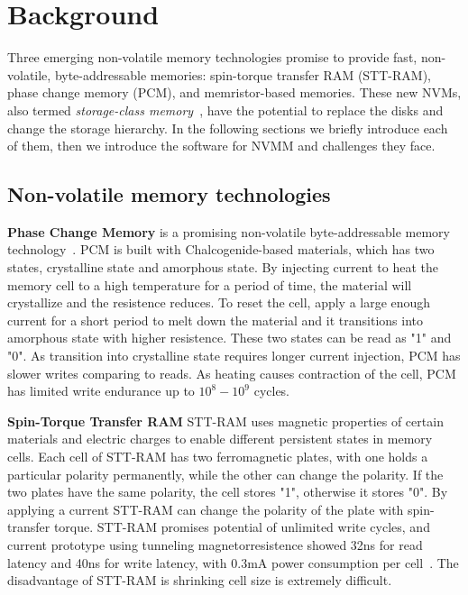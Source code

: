 \section{Background}
\label{sec:background}

Three emerging non-volatile memory technologies promise to provide fast,
 non-volatile, byte-addressable memories: spin-torque transfer RAM (STT-RAM),
phase change memory (PCM), and memristor-based memories. These new NVMs, also
termed \emph{storage-class memory}~\cite{scm}, have the potential to replace
the disks and change the storage hierarchy. In the following
sections we briefly introduce each of them, then we introduce the software
for NVMM and challenges they face.

\subsection{Non-volatile memory technologies}
\label{sec:hardware}

\textbf{Phase Change Memory} is a promising non-volatile byte-addressable
memory technology~\cite{PCM_EfficientMainMemory, PCMHierarchy}.
PCM is built with Chalcogenide-based materials, which has
two states, crystalline state and amorphous state. By
injecting current to heat the memory cell to a high temperature for a period
of time, the material will crystallize and the resistence reduces. 
To reset the cell,
apply a large enough current for a short period to melt down the
material and it transitions into amorphous state with higher resistence.
 These two states can be read as "1" and "0". As transition into crystalline
state requires longer current injection, PCM has slower writes comparing to
reads.  
As heating causes contraction of the cell, PCM has limited write endurance
up to $10^8 - 10^9$ cycles.
 
\textbf{Spin-Torque Transfer RAM} STT-RAM uses magnetic properties of 
certain materials and electric charges to enable different persistent states 
in memory cells. Each cell of STT-RAM has two ferromagnetic plates, with
one holds a particular polarity permanently, while the other can change the
polarity. If the two plates have the same polarity, the cell stores "1",
otherwise it stores "0". By applying a current STT-RAM can change the polarity
of the plate with spin-transfer torque.
STT-RAM promises potential of unlimited write cycles, and
current prototype using tunneling magnetorresistence showed 32ns for
read latency and 40ns for write latency, with 0.3mA power consumption
per cell~\cite{sttram}. The disadvantage of STT-RAM is shrinking cell size is
extremely difficult.

